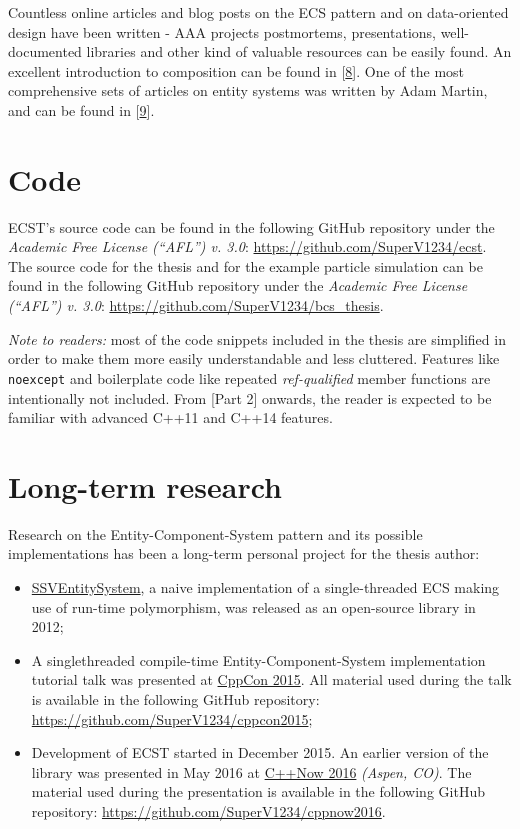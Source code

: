 \documentclass[twoside, 12pt, a4paper, openany]{book}
\begin{document}
Countless online articles and blog posts on the ECS pattern and on
data-oriented design have been written - AAA projects postmortems,
presentations, well-documented libraries and other kind of valuable
resources can be easily found. An excellent introduction to composition
can be found in
{[}\protect\hyperlink{ref-robertnystorm_gpp_component}{8}{]}. One of the
most comprehensive sets of articles on entity systems was written by
Adam Martin, and can be found in
{[}\protect\hyperlink{ref-tmachine_es_category}{9}{]}.

\section{Code}\label{code}

ECST's source code can be found in the following GitHub repository under
the \emph{Academic Free License (``AFL'') v. 3.0}:
\url{https://github.com/SuperV1234/ecst}. The source code for the thesis
and for the example particle simulation can be found in the following
GitHub repository under the \emph{Academic Free License (``AFL'') v.
3.0}: \url{https://github.com/SuperV1234/bcs_thesis}.

\emph{Note to readers:} most of the code snippets included in the thesis
are simplified in order to make them more easily understandable and less
cluttered. Features like
\texttt{noexcept}
and boilerplate code like repeated \emph{ref-qualified} member functions
are intentionally not included. From {[}Part 2{]} onwards, the reader is
expected to be familiar with advanced C++11 and C++14 features.

\section{Long-term research}\label{long-term-research}

Research on the Entity-Component-System pattern and its possible
implementations has been a long-term personal project for the thesis
author:

\begin{itemize}
\item
  \href{https://github.com/SuperV1234/SSVEntitySystem}{SSVEntitySystem},
  a naive implementation of a single-threaded ECS making use of run-time
  polymorphism, was released as an open-source library in 2012;
\item
  A singlethreaded compile-time Entity-Component-System implementation
  tutorial talk was presented at \href{http://cppcon.org}{CppCon 2015}.
  All material used during the talk is available in the following GitHub
  repository: \url{https://github.com/SuperV1234/cppcon2015};
\item
  Development of ECST started in December 2015. An earlier version of
  the library was presented in May 2016 at
  \href{http://cppnow.org}{C++Now 2016} \emph{(Aspen, CO)}. The material
  used during the presentation is available in the following GitHub
  repository: \url{https://github.com/SuperV1234/cppnow2016}.
\end{itemize}
\end{document}
